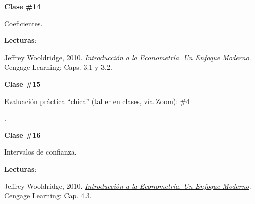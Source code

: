\documentclass[letterpaper]{article}
\renewenvironment{itemize}{
  \begin{list}{}{
    \setlength{\leftmargin}{1.5em}
  }
}{
  \end{list}
}
\begin{document}
\begin{enumerate}
			\begin{itemize} 
				\item[$\bullet$] {\bf Clase \#14}
					\begin{itemize} 
						\item[$\circ$] Coeficientes. %
						\item[$\circ$] {\bf Lecturas}: 
							\begin{itemize}
								\item[$\diamond$] Jeffrey Wooldridge, 2010. \href{https://github.com/hbahamonde/Metodos_de_Investigacion/raw/master/Readings/Wooldridge.pdf}{\emph{Introducci\'on a la Econometr\'ia. Un Enfoque Moderno}}. Cengage Learning: Caps. 3.1 y 3.2.
							\end{itemize}
					\end{itemize}
			\end{itemize}



			\begin{itemize} 
				\item[$\bullet$] {\bf Clase \#15}
					\begin{itemize} 
						{\color{red}\item[\Pointinghand] Evaluaci\'on pr\'actica ``chica'' (taller en clases, v\'ia Zoom): \#4}.
					\end{itemize}
			\end{itemize}



			\begin{itemize} 
				\item[$\bullet$] {\bf Clase \#16}
					\begin{itemize} 
						\item[$\circ$] Intervalos de confianza. %
						\item[$\circ$] {\bf Lecturas}: 
							\begin{itemize}
								\item[$\diamond$] Jeffrey Wooldridge, 2010. \href{https://github.com/hbahamonde/Metodos_de_Investigacion/raw/master/Readings/Wooldridge.pdf}{\emph{Introducci\'on a la Econometr\'ia. Un Enfoque Moderno}}. Cengage Learning: Cap. 4.3.
							\end{itemize}
					\end{itemize}
			\end{itemize}




\end{enumerate}
\end{document}
